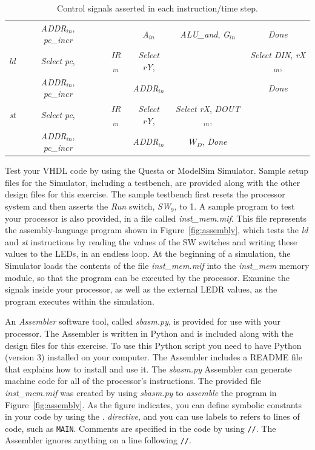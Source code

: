 \documentclass[epsfig,10pt,fullpage]{article} \addtolength{\textwidth}{1.5in}
\newcommand{\blue}[1]{{\color{blue}\sf{#1}}}
\begin{document}
\begin{enumerate}
\begin{table}[H]
\begin{center}
\begin{tabular}{r|c|c|c|c|c|c|}
~ & {\it ADDR}$_{in}$, {\it pc\_incr} & ~ & ~ & {\it A$_{in}$} &  {\it ALU\_and}, {\it G$_{in}$} & {\it Done} \\
\cline{2-7}
\rule[-0.075in]{0in}{0.25in}{\it ld~} & {\it Select} {\it
pc}, & ~ & {\it IR}$_{in}$ & {\it
Select} {\it rY}, &  & {\it Select DIN}, {\it rX$_{in}$}, \\
~ & {\it ADDR}$_{in}$, {\it pc\_incr} & ~ & ~ & {\it ADDR}$_{in}$ &  & {\it Done} \\
\cline{2-7}
\rule[-0.075in]{0in}{0.25in}{\it st~} & {\it Select} {\it
pc}, & ~ & {\it IR}$_{in}$ & {\it
Select} {\it rY}, & {\it Select rX}, {\it DOUT$_{in}$}, & \\
~ & {\it ADDR}$_{in}$, {\it pc\_incr} & ~ & ~ & {\it ADDR$_{in}$} & $W_D$, {\it Done} & \\
\cline{2-7}
\end{tabular}
\caption{Control signals asserted in each instruction/time step.}
\label{tab:control_signals}
\end{center}
\end{table}

Test your VHDL code by using the Questa or ModelSim
Simulator. Sample setup files for the Simulator, including a testbench, are provided along with 
the other design files for this exercise.  The sample testbench first resets the processor system
and then asserts the {\it Run} switch, {\it SW}$_9$, to 1. A sample program to test your 
processor is also provided, in a file called {\it inst\_mem.mif}. This file represents the 
assembly-language program shown in Figure~\ref{fig:assembly}, which tests 
the {\it ld} and {\it st} instructions by reading the values of the SW switches and writing 
these values to the LEDs, in an endless loop. At the beginning of a simulation, the Simulator 
loads the contents of the file {\it inst\_mem.mif} into the {\it inst\_mem} memory module, so
that the program can be executed by the processor.  Examine the signals inside 
your processor, as well as the external LEDR values, as the program executes within the
simulation.

An {\it Assembler} software tool, called {\it sbasm.py}, is provided for use with your processor.
The Assembler is written in Python and is included along with the design files for this exercise.
To use this Python script you need to have Python (version 3) installed on your computer. 
The Assembler includes
a README file that explains how to install and use it. The {\it sbasm.py} Assembler can 
generate machine code for all of the processor's instructions. The provided file 
{\it inst\_mem.mif} was created by using {\it sbasm.py} to {\it assemble} the program in 
Figure~\ref{fig:assembly}. As the figure indicates, you can define symbolic
constants in your code by using the .\blue{define} {\it directive}, and you can use 
labels to refers to lines of code, such as \texttt{MAIN}.
Comments are specified in the code by using \texttt{//}. The Assembler ignores anything 
on a line following \texttt{//}.


\end{enumerate}
\end{document}
